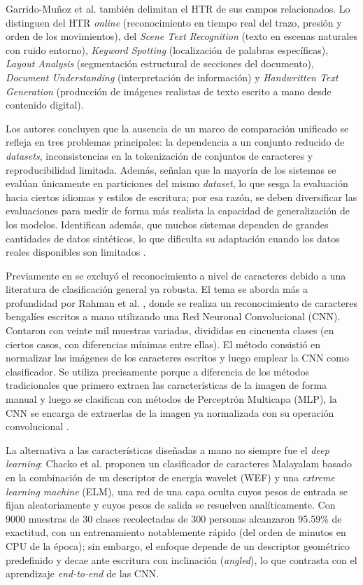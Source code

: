 \documentclass[conference]{IEEEtran}
\begin{document}
Garrido-Muñoz et al. \cite{garrido-munoz_handwritten_2026} también delimitan el HTR de sus campos relacionados. Lo distinguen del HTR \textit{online} (reconocimiento en tiempo real del trazo, presión y orden de los movimientos), del \textit{Scene Text Recognition} (texto en escenas naturales con ruido  entorno),  \textit{Keyword Spotting} (localización de palabras específicas), \textit{Layout Analysis} (segmentación estructural de secciones del documento), \textit{Document Understanding} (interpretación de información) y \textit{Handwritten Text Generation} (producción de imágenes realistas de texto escrito a mano desde contenido digital).

Los autores concluyen que la ausencia de un marco de comparación unificado se refleja en tres problemas principales: la dependencia a un conjunto reducido de \textit{datasets}, inconsistencias en la tokenización de conjuntos de caracteres  y  reproducibilidad limitada. Además, señalan que la mayoría de los sistemas se evalúan únicamente en particiones del mismo \textit{dataset}, lo que sesga la evaluación hacia ciertos idiomas y estilos de escritura; por esa razón, se deben diversificar las evaluaciones para medir de forma más realista la capacidad de generalización de los modelos. Identifican además, que muchos sistemas dependen de grandes cantidades de datos sintéticos, lo que dificulta su adaptación cuando los datos reales disponibles son limitados \cite{garrido-munoz_handwritten_2026}.

Previamente en \cite{garrido-munoz_handwritten_2026} se excluyó el reconocimiento a nivel de caracteres debido a una literatura de clasificación general ya robusta. El tema se aborda más a profundidad por Rahman et al. \cite{bangla_cnn_2015}, donde se realiza un reconocimiento de caracteres bengalíes escritos a mano utilizando una Red Neuronal Convolucional (CNN). Contaron con veinte mil muestras variadas, divididas en cincuenta clases (en ciertos casos, con diferencias mínimas entre ellas). El método consistió en normalizar las imágenes de los caracteres escritos y luego emplear la CNN como clasificador. Se utiliza precisamente porque a diferencia de los métodos tradicionales que primero extraen las características de la imagen de forma manual y luego se clasifican con métodos de Perceptrón Multicapa (MLP), la CNN se encarga de extraerlas de la imagen ya normalizada con su operación convolucional \cite{bangla_cnn_2015}.

La alternativa a las características diseñadas a mano no siempre fue el \textit{deep learning}: Chacko et al. \cite{chacko_wavelet_2012} proponen un clasificador de caracteres Malayalam basado en la combinación de un descriptor de energía wavelet (WEF) y una \textit{extreme learning machine} (ELM), una red de una capa oculta cuyos pesos de entrada se fijan aleatoriamente y cuyos pesos de salida se resuelven analíticamente. Con 9000 muestras de 30 clases recolectadas de 300 personas alcanzaron 95.59\% de exactitud, con un entrenamiento notablemente rápido (del orden de minutos en CPU de la época); sin embargo, el enfoque depende de un descriptor geométrico predefinido y decae ante escritura con inclinación (\textit{angled}), lo que contrasta con el aprendizaje \textit{end-to-end} de las CNN.
\end{document}
